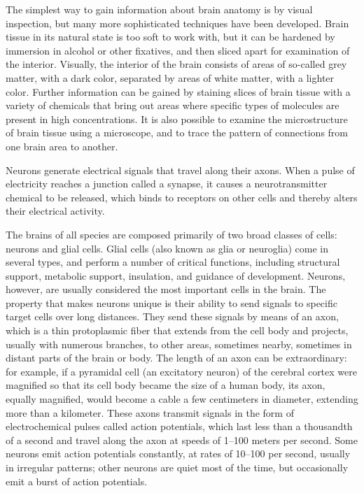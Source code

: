 The simplest way to gain information about brain anatomy is by visual inspection, but many more sophisticated techniques have been developed. Brain tissue in its natural state is too soft to work with, but it can be hardened by immersion in alcohol or other fixatives, and then sliced apart for examination of the interior. Visually, the interior of the brain consists of areas of so-called grey matter, with a dark color, separated by areas of white matter, with a lighter color. Further information can be gained by staining slices of brain tissue with a variety of chemicals that bring out areas where specific types of molecules are present in high concentrations. It is also possible to examine the microstructure of brain tissue using a microscope, and to trace the pattern of connections from one brain area to another.

Neurons generate electrical signals that travel along their axons. When a pulse of electricity reaches a junction called a synapse, it causes a neurotransmitter chemical to be released, which binds to receptors on other cells and thereby alters their electrical activity.

The brains of all species are composed primarily of two broad classes of cells: neurons and glial cells. Glial cells (also known as glia or neuroglia) come in several types, and perform a number of critical functions, including structural support, metabolic support, insulation, and guidance of development. Neurons, however, are usually considered the most important cells in the brain. The property that makes neurons unique is their ability to send signals to specific target cells over long distances. They send these signals by means of an axon, which is a thin protoplasmic fiber that extends from the cell body and projects, usually with numerous branches, to other areas, sometimes nearby, sometimes in distant parts of the brain or body. The length of an axon can be extraordinary: for example, if a pyramidal cell (an excitatory neuron) of the cerebral cortex were magnified so that its cell body became the size of a human body, its axon, equally magnified, would become a cable a few centimeters in diameter, extending more than a kilometer. These axons transmit signals in the form of electrochemical pulses called action potentials, which last less than a thousandth of a second and travel along the axon at speeds of 1--100 meters per second. Some neurons emit action potentials constantly, at rates of 10--100 per second, usually in irregular patterns; other neurons are quiet most of the time, but occasionally emit a burst of action potentials.

